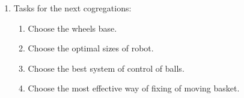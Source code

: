 \begin{enumerate}
	\item Tasks for the next cogregations:
	\begin{enumerate}
	  \item Choose the wheels base.
	  
	  \item Choose the optimal sizes of robot.
	  
	  \item Choose the best system of control of balls.
	  
	  \item Choose the most effective way of fixing of moving basket.
	  
    \end{enumerate}
\end{enumerate}
\fillpage


